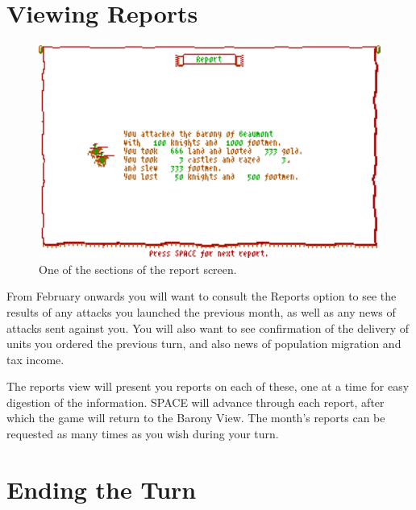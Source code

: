 \documentclass[8pt]{extarticle}
\begin{document}
%
%

\pagebreak %
\section*{Viewing Reports}

\begin{figure}
  \centering
  \includegraphics[width=\textwidth]{report}
  \caption*{One of the sections of the report screen.}
  \label{fig:title}
\end{figure}

\begin{multicols}{2}
\noindent
From February onwards you will want to consult the Reports option to see the results of any attacks you launched the previous month, as well as any news of attacks sent against you. You will also want to see confirmation of the delivery of units you ordered the previous turn, and also news of population migration and tax income.

The reports view will present you reports on each of these, one at a time for easy digestion of the information. SPACE will advance through each report, after which the game will return to the Barony View. The month's reports can be requested as many times as you wish during your turn.
\end{multicols}

%
%

\pagebreak %
\section*{Ending the Turn}
\end{document}
